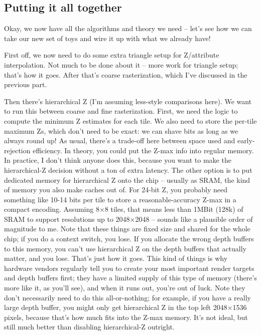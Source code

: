 \documentclass[12pt]{article}
\begin{document}
\subsection{Putting it all together}
\label{sec:org4e44117}

Okay, we now have all the algorithms and theory we need – let’s see how we can take our new set of toys and wire it up with what we already have!

First off, we now need to do some extra triangle setup for Z/attribute interpolation. Not much to be done about it – more work for triangle setup; that’s how it goes. After that’s coarse rasterization, which I’ve discussed in the previous part.

Then there’s hierarchical Z (I’m assuming less-style comparisons here). We want to run this between coarse and fine rasterization. First, we need the logic to compute the minimum Z estimates for each tile. We also need to store the per-tile maximum Zs, which don’t need to be exact: we can shave bits as long as we always round up! As usual, there’s a trade-off here between space used and early-rejection efficiency. In theory, you could put the Z-max info into regular memory. In practice, I don’t think anyone does this, because you want to make the hierarchical-Z decision without a ton of extra latency. The other option is to put dedicated memory for hierarchical Z onto the chip – usually as SRAM, the kind of memory you also make caches out of. For 24-bit Z, you probably need something like 10-14 bits per tile to store a reasonable-accuracy Z-max in a compact encoding. Assuming 8×8 tiles, that means less than 1MBit (128k) of SRAM to support resolutions up to 2048×2048 – sounds like a plausible order of magnitude to me. Note that these things are fixed size and shared for the whole chip; if you do a context switch, you lose. If you allocate the wrong depth buffers to this memory, you can’t use hierarchical Z on the depth buffers that actually matter, and you lose. That’s just how it goes. This kind of things is why hardware vendors regularly tell you to create your most important render targets and depth buffers first; they have a limited supply of this type of memory (there’s more like it, as you’ll see), and when it runs out, you’re out of luck. Note they don’t necessarily need to do this all-or-nothing; for example, if you have a really large depth buffer, you might only get hierarchical Z in the top left 2048×1536 pixels, because that’s how much fits into the Z-max memory. It’s not ideal, but still much better than disabling hierarchical-Z outright.
\end{document}
